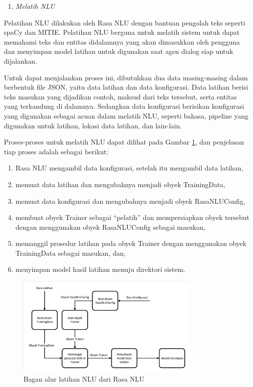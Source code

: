 \begin{enumerate}[label=\textit{\Alph*)}, itemindent=*, series=rasa_process_list]
	\item \textit{Melatih NLU}
\end{enumerate}

Pelatihan NLU dilakukan oleh Rasa NLU dengan bantuan pengolah teks seperti spaCy dan MITIE. Pelatihan NLU berguna untuk melatih sistem untuk dapat memahami teks dan entitas didalamnya yang akan dimasukkan oleh pengguna dan menyimpan model latihan untuk digunakan saat agen dialog siap untuk dijalankan.

Untuk dapat menjalankan proses ini, dibutuhkan dua data masing-masing dalam berbentuk file JSON, yaitu data latihan dan data konfigurasi. Data latihan berisi teks masukan yang dijadikan contoh, maksud dari teks tersebut, serta entitas yang terkandung di dalamnya. Sedangkan data konfigurasi berisikan konfigurasi yang digunakan sebagai acuan dalam melatih NLU, seperti bahasa, pipeline yang digunakan untuk latihan, lokasi data latihan, dan lain-lain.

Proses-proses untuk melatih NLU dapat dilihat pada Gambar \ref{fig:rasaNLU_train}, dan penjelasan tiap proses adalah sebagai berikut:

\begin{enumerate}
	\item Rasa NLU mengambil data konfigurasi, setelah itu mengambil data latihan,
	\item memuat data latihan dan mengubahnya menjadi obyek TrainingData,
	\item memuat data konfigurasi dan mengubahnya menjadi obyek RasaNLUConfig,
	\item membuat obyek Trainer sebagai “pelatih” dan mempersiapkan obyek tersebut dengan menggunakan obyek RasaNLUConfig sebagai masukan,
	\item memanggil prosedur latihan pada obyek Trainer dengan menggunakan obyek TrainingData sebagai masukan, dan,
	\item menyimpan model hasil latihan menuju direktori sistem.
\end{enumerate}

\begin{figure}[H]
	\centering
	\includegraphics[width=0.8\textwidth, trim=2 2 2 2, clip]{resources/2/rasaNLU_train.pdf}
	\caption{Bagan alur latihan NLU dari Rasa NLU}
	\label{fig:rasaNLU_train}
\end{figure}

